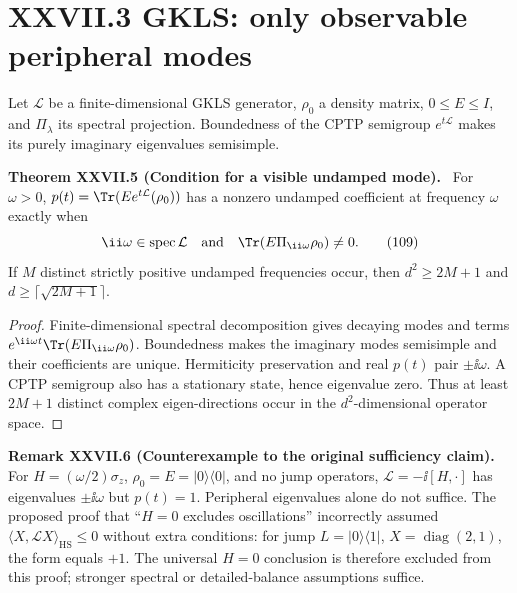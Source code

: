 \documentclass[11pt,a4paper,oneside]{book}
\DeclareMathOperator{\spec}{spec}\DeclareMathOperator{\diag}{diag}
\newcommand{\statement}[3]{\par\medskip\noindent\textbf{#1 #2 (#3).}\ }
\begin{document}
\section*{XXVII.3 GKLS: only observable peripheral modes}
Let $\mathcal L$ be a finite-dimensional GKLS generator, $\rho_0$ a density matrix, $0\le E\le I$, and $\Pi_\lambda$ its spectral projection. Boundedness of the CPTP semigroup $e^{t\mathcal L}$ makes its purely imaginary eigenvalues semisimple.
\statement{Theorem}{XXVII.5}{Condition for a visible undamped mode} For $\omega>0$, $p(t)=\Tr(Ee^{t\mathcal L}(\rho_0))$ has a nonzero undamped coefficient at frequency $\omega$ exactly when
\begin{equation}\ii\omega\in\spec\mathcal L\quad\text{and}\quad\Tr(E\Pi_{\ii\omega}\rho_0)\ne0.\tag{109}\end{equation}
If $M$ distinct strictly positive undamped frequencies occur, then $d^2\ge2M+1$ and $d\ge\lceil\sqrt{2M+1}\rceil$.
\begin{proof}Finite-dimensional spectral decomposition gives decaying modes and terms $e^{\ii\omega t}\Tr(E\Pi_{\ii\omega}\rho_0)$. Boundedness makes the imaginary modes semisimple and their coefficients are unique. Hermiticity preservation and real $p(t)$ pair $\pm\ii\omega$. A CPTP semigroup also has a stationary state, hence eigenvalue zero. Thus at least $2M+1$ distinct complex eigen-directions occur in the $d^2$-dimensional operator space.\end{proof}
\statement{Remark}{XXVII.6}{Counterexample to the original sufficiency claim} For $H=(\omega/2)\sigma_z$, $\rho_0=E=|0\rangle\langle0|$, and no jump operators, $\mathcal L=-\ii[H,\cdot]$ has eigenvalues $\pm\ii\omega$ but $p(t)=1$. Peripheral eigenvalues alone do not suffice. The proposed proof that ``$H=0$ excludes oscillations'' incorrectly assumed $\langle X,\mathcal LX\rangle_{\mathrm{HS}}\le0$ without extra conditions: for jump $L=|0\rangle\langle1|$, $X=\diag(2,1)$, the form equals $+1$. The universal $H=0$ conclusion is therefore excluded from this proof; stronger spectral or detailed-balance assumptions suffice.
\end{document}
